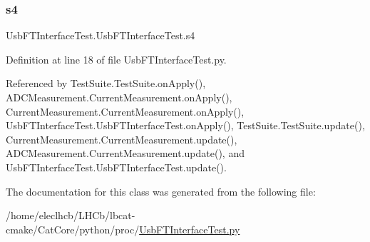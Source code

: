 \mbox{\label{classUsbFTInterfaceTest_1_1UsbFTInterfaceTest_ae2ffe3d7a87c993af4ff50c252dd742e}} 
\subsubsection{\texorpdfstring{s4}{s4}}
{\footnotesize\ttfamily Usb\+F\+T\+Interface\+Test.\+Usb\+F\+T\+Interface\+Test.\+s4}



Definition at line 18 of file Usb\+F\+T\+Interface\+Test.\+py.



Referenced by Test\+Suite.\+Test\+Suite.\+on\+Apply(), A\+D\+C\+Measurement.\+Current\+Measurement.\+on\+Apply(), Current\+Measurement.\+Current\+Measurement.\+on\+Apply(), Usb\+F\+T\+Interface\+Test.\+Usb\+F\+T\+Interface\+Test.\+on\+Apply(), Test\+Suite.\+Test\+Suite.\+update(), Current\+Measurement.\+Current\+Measurement.\+update(), A\+D\+C\+Measurement.\+Current\+Measurement.\+update(), and Usb\+F\+T\+Interface\+Test.\+Usb\+F\+T\+Interface\+Test.\+update().



The documentation for this class was generated from the following file\+:\begin{DoxyCompactItemize}
\item 
/home/eleclhcb/\+L\+H\+Cb/lbcat-\/cmake/\+Cat\+Core/python/proc/\hyperlink{UsbFTInterfaceTest_8py}{Usb\+F\+T\+Interface\+Test.\+py}\end{DoxyCompactItemize}
